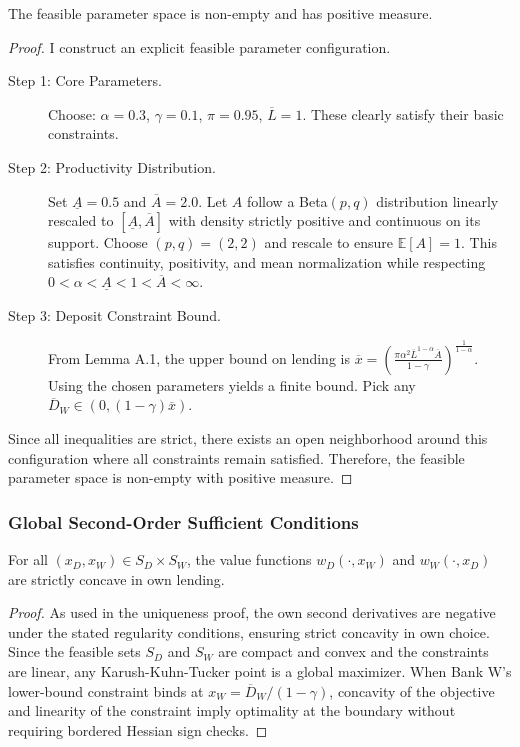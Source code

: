 \documentclass[12pt]{article}
\begin{document}
\begin{lemma}
The feasible parameter space is non-empty and has positive measure.
\end{lemma}
\begin{proof}
I construct an explicit feasible parameter configuration.
\begin{description}
    \item[Step 1: Core Parameters.] Choose: $\alpha = 0.3$, $\gamma=0.1$, $\pi=0.95$, $\overline{L}=1$. These clearly satisfy their basic constraints.
    \item[Step 2: Productivity Distribution.] Set $\underline{A}=0.5$ and $\overline{A}=2.0$. Let $A$ follow a Beta$(p,q)$ distribution linearly rescaled to $[\underline A,\overline A]$ with density strictly positive and continuous on its support. Choose $(p,q)=(2,2)$ and rescale to ensure $\mathbb E[A]=1$. This satisfies continuity, positivity, and mean normalization while respecting $0<\alpha<\underline A<1<\overline A<\infty$.
    \item[Step 3: Deposit Constraint Bound.] From Lemma A.1, the upper bound on lending is $\overline{x} = \left(\frac{\pi\alpha^{2}\overline{L}^{1-\alpha}\overline{A}}{1-\gamma}\right)^{\frac{1}{1-\alpha}}$. Using the chosen parameters yields a finite bound. Pick any $\overline{D}_{W} \in (0,(1-\gamma)\overline{x})$.
\end{description}
Since all inequalities are strict, there exists an open neighborhood around this configuration where all constraints remain satisfied. Therefore, the feasible parameter space is non-empty with positive measure.
\end{proof}

\subsubsection{Global Second-Order Sufficient Conditions}
\begin{lemma}
For all $(x_{D},x_{W}) \in S_{D} \times S_{W}$, the value functions $w_{D}(\cdot, x_W)$ and $w_{W}(\cdot, x_D)$ are strictly concave in own lending.
\end{lemma}
\begin{proof}
As used in the uniqueness proof, the own second derivatives are negative under the stated regularity conditions, ensuring strict concavity in own choice. Since the feasible sets $S_D$ and $S_W$ are compact and convex and the constraints are linear, any Karush-Kuhn-Tucker point is a global maximizer. When Bank W's lower-bound constraint binds at $x_{W} = \overline{D}_{W}/(1-\gamma)$, concavity of the objective and linearity of the constraint imply optimality at the boundary without requiring bordered Hessian sign checks.
\end{proof}
\end{document}
